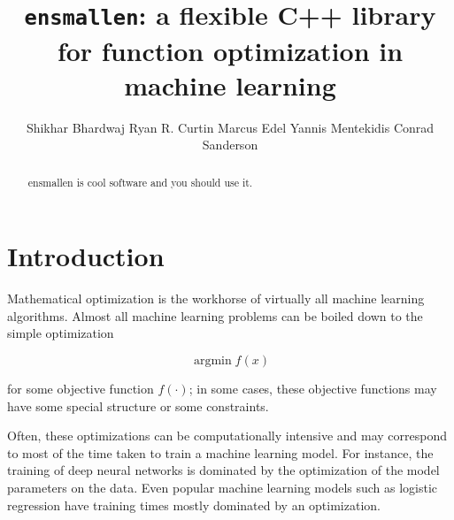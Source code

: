 \documentclass{article}
\begin{document}
\title{\texttt{ensmallen}: a flexible C++ library for function optimization in machine learning}


\author{Shikhar Bhardwaj \And Ryan R. Curtin \And Marcus Edel \And Yannis
Mentekidis \And Conrad Sanderson}

\maketitle

\begin{abstract}
ensmallen is cool software and you should use it.
\end{abstract}

\section{Introduction}

Mathematical optimization is the workhorse of virtually all machine learning
algorithms.  Almost all machine learning problems can be boiled down to the
simple optimization

\begin{equation}
\operatorname{argmin} f(x)
\end{equation}

\noindent for some objective function $f(\cdot)$; in some cases, these objective
functions may have some special structure or some constraints.

Often, these optimizations can be computationally intensive and may correspond
to most of the time taken to train a machine learning model.  For instance, the
training of deep neural networks is dominated by the optimization of the model
parameters on the data. %
Even popular machine learning models such as logistic regression %
have training times mostly dominated by an optimization.
%
\end{document}

